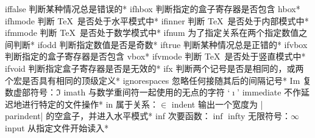 \capcs iffalse {判断某种情况总是错误的}*{\@iffalse}
\capcs ifhbox {判断指定的盒子寄存器是否包含 hbox}*{\@ifhbox}
\capcs ifhmode {判断 \TeX\ 是否处于水平模式中}*{\@ifhmode}
\capcs ifinner {判断 \TeX\ 是否处于内部模式中}*{\@ifinner}
\capcs ifmmode {判断 \TeX\ 是否处于数学模式中}*{\@ifmmode}
\capcs ifnum {为了指定关系在两个指定数值之间判断}*{\@ifnum}
\capcs ifodd {判断指定数值是否是奇数}*{\@ifodd}
\capcs iftrue {判断某种情况总是正错的}*{\@iftrue}
\capcs ifvbox {判断指定的盒子寄存器是否包含 vbox}*{\@ifvbox}
\capcs ifvmode {判断 \TeX\ 是否处于竖直模式中}*{\@ifvmode}
\capcs ifvoid {判断指定盒子寄存器是否是无效的}*{\@ifvoid}
\capcs ifx {判断两个记号是否是相同的，或两个宏是否具有相同的顶级定义}*{\@ifx}
\capcs ignorespaces {忽略任何接随其后的间隔记号}*{}
\capcs Im {复数虚部符号：$\Im$}{}{}
\capcs imath {与数学重间符一起使用的无点的字符 `$\imath$'}{}{}
\capcs immediate {不作延迟地进行特定的文件操作}*{}
\capcs in {属于关系：$\in$}{}{}
\capcs indent {输出一个宽度为 |\\parindent| 的空盒子，并进入水平模式}*{}
\capcs inf {次要函数：$\inf$}{}{}
\capcs infty {无限符号：$\infty$}{}{}
\capcs input {从指定文件开始读入}*{}

